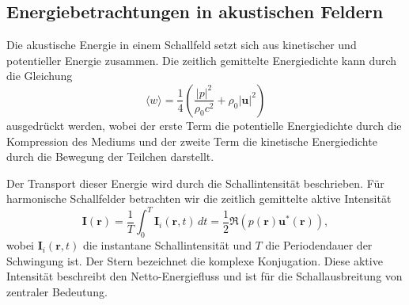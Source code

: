  
 
 

\subsection{Energiebetrachtungen in akustischen Feldern
\label{helmholtz:subsection:Energiebetrachtung}}
%
Die akustische Energie in einem Schallfeld setzt sich aus kinetischer
und potentieller Energie zusammen.
Die zeitlich gemittelte Energiedichte kann durch die Gleichung
%
\begin{equation}
\langle w \rangle
=
\frac{1}{4}\left(\frac{|p|^2}{\rho_0 c^2} + \rho_0 |\boldsymbol{u}|^2 \right)
\end{equation}
ausgedrückt werden,
wobei der erste Term die potentielle Energiedichte durch die
Kompression des Mediums und der zweite Term die kinetische
Energiedichte durch die Bewegung der Teilchen darstellt.

Der Transport dieser Energie wird durch die Schallintensität
beschrieben.
Für harmonische Schallfelder betrachten wir die zeitlich
gemittelte aktive Intensität
\begin{equation}
\boldsymbol{I}(\boldsymbol{r})
=
\frac{1}{T}\int_0^T \boldsymbol{I}_i(\boldsymbol{r},t)\,dt
=
\frac{1}{2}\Re (p(\boldsymbol{r}) \boldsymbol{u}^*(\boldsymbol{r})),
\end{equation}
wobei $\boldsymbol{I}_i(\boldsymbol{r},t)$ die instantane
Schallintensität und $T$ die Periodendauer der Schwingung ist.
Der Stern bezeichnet die komplexe Konjugation.
Diese aktive Intensität beschreibt den Netto-Energiefluss und ist
für die Schallausbreitung von zentraler Bedeutung.

